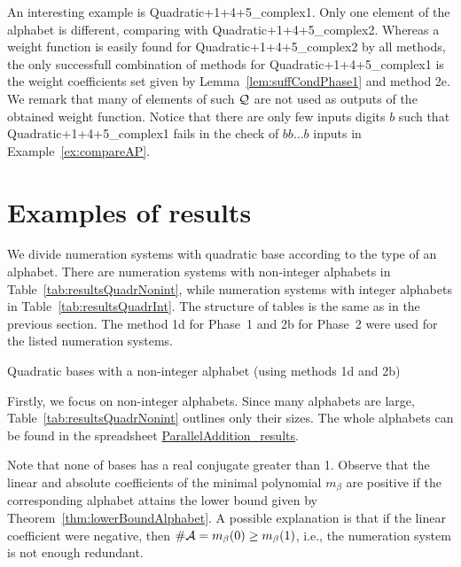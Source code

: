 An interesting example is Quadratic+1+4+5\_complex1. Only one element of the alphabet is different, comparing with Quadratic+1+4+5\_complex2. Whereas a weight function is easily found for Quadratic+1+4+5\_complex2 by all methods, the only successfull combination of methods for Quadratic+1+4+5\_complex1 is the weight coefficients set given by Lemma~\ref{lem:suffCondPhase1} and method 2e. We remark that many of elements of such $\mathcal{Q}$ are not used as outputs of the obtained weight function. Notice   that there are only few inputs digits $b$ such that  Quadratic+1+4+5\_complex1 fails in the check of $bb\dots b$ inputs in Example~\ref{ex:compareAP}.





\section{Examples of results}
\label{sec:resultsExamples}
We divide numeration systems with quadratic base according to the type of an alphabet. There are numeration systems with non-integer alphabets in Table~\ref{tab:resultsQuadrNonint}, while numeration systems with integer alphabets in Table~\ref{tab:resultsQuadrInt}. The structure of tables is the same as in the previous section. The method 1d for Phase~1 and 2b for Phase~2 were used for the listed numeration systems.

\begin{table}[tpb]
	\begin{center}
	
	\end{center}
\caption{Quadratic bases with a non-integer alphabet (using methods 1d and 2b)}
\label{tab:resultsQuadrNonint}
\end{table}

Firstly, we focus on non-integer alphabets. Since many alphabets are large, Table~\ref{tab:resultsQuadrNonint} outlines only their sizes. The whole alphabets can be found in the spreadsheet \href{https://docs.google.com/spreadsheets/d/1TnhrHdefHfHa0WSeVs4q6XVj3epjPlPlnoekE0E1xeM/edit?usp=sharing}{ParallelAddition\_results}.

Note that none of bases has a real conjugate greater than 1. Observe that the linear and absolute coefficients of the minimal polynomial $m_\beta$ are positive if the corresponding alphabet attains the lower bound given by Theorem~\ref{thm:lowerBoundAlphabet}. A possible explanation is that if the linear coefficient were negative, then $\#\mathcal{A}=m_\beta(0)\geq m_\beta(1)$, i.e., the numeration system is not enough redundant.


